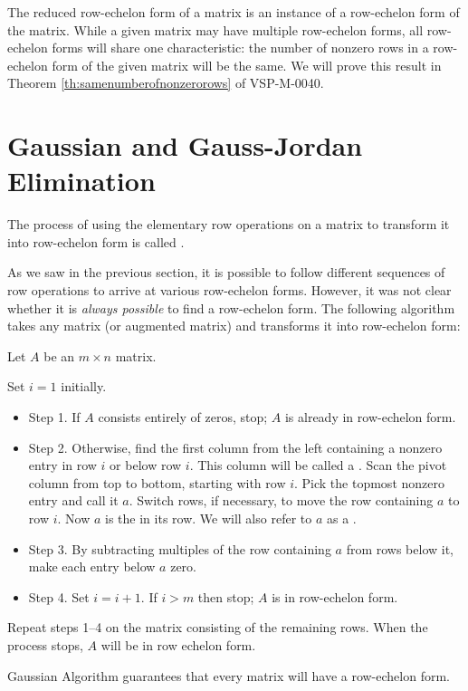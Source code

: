 \documentclass{ximera}
\begin{document}
The reduced row-echelon form of a matrix is an instance of a row-echelon form of the matrix.  While a given matrix may have multiple row-echelon forms, all row-echelon forms will share one characteristic: the number of nonzero rows in a row-echelon form of the given matrix will be the same.
We will prove this result in Theorem \ref{th:samenumberofnonzerorows} of VSP-M-0040.

\section*{Gaussian and Gauss-Jordan Elimination}

\begin{definition}\label{def:GaussianElimination}
The process of using the elementary row operations on a matrix to transform it into row-echelon form is called .
\end{definition}

As we saw in the previous section, it is possible to follow different sequences of row operations to arrive at various row-echelon forms.  However, it was not clear whether it is {\it always possible} to find a row-echelon form.  The following algorithm takes any matrix (or augmented matrix) and transforms it into row-echelon form:
\begin{algorithm} \label{alg:gaussian} 
Let $A$ be an $m\times n$ matrix.

Set $i=1$ initially.
\begin{itemize}
\item[] Step 1. If $A$ consists entirely of zeros, stop;  $A$ is already in row-echelon form.

\item[] Step 2. Otherwise, find the first column from the left containing a nonzero entry in row $i$ or below row $i$.  This column will be called a .  Scan the pivot column from top to bottom, starting with row $i$.  Pick the topmost nonzero entry and call it $a$.  Switch rows, if necessary, to move the row containing $a$ to row $i$.  Now $a$ is the  in its row.  We will also refer to $a$ as a .  

\item[] Step 3. By subtracting multiples of the row containing $a$ from rows below it, make each entry below $a$ zero.

\item[] Step 4.  Set $i=i+1$.  If $i>m$ then stop; $A$ is in row-echelon form.

\end{itemize}

Repeat steps 1--4 on the matrix consisting of the remaining rows.
When the process stops, $A$ will be in row echelon form.
\end{algorithm}
Gaussian Algorithm guarantees that every matrix will have a row-echelon form.  
\end{document}
